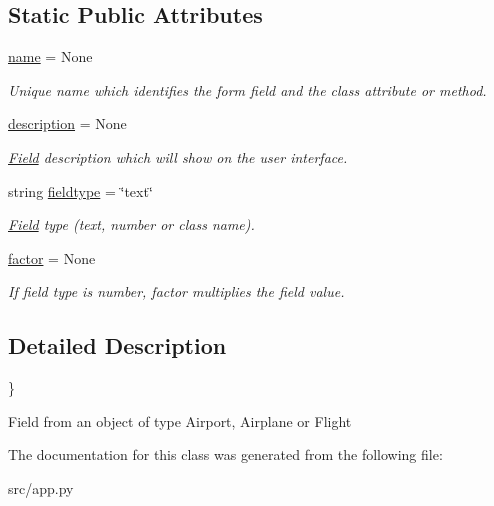 \subsection*{Static Public Attributes}
\begin{DoxyCompactItemize}
\item 
\hyperlink{group___g_u_i_ga74bf1ee16d2de49ee707cab9ecba123b}{name} = None
\begin{DoxyCompactList}\small\item\em Unique name which identifies the form field and the class attribute or method. \end{DoxyCompactList}\item 
\hyperlink{group___g_u_i_gadd42fca0c131874daa29902266d514cd}{description} = None
\begin{DoxyCompactList}\small\item\em \hyperlink{classapp_1_1_app_1_1_field}{Field} description which will show on the user interface. \end{DoxyCompactList}\item 
string \hyperlink{group___g_u_i_ga2b84546c227ee521e1a4776cd07aabe8}{fieldtype} = \char`\"{}text\char`\"{}
\begin{DoxyCompactList}\small\item\em \hyperlink{classapp_1_1_app_1_1_field}{Field} type (text, number or class name). \end{DoxyCompactList}\item 
\hyperlink{group___g_u_i_ga6a50e1c443b963d286ed393be38e00fd}{factor} = None
\begin{DoxyCompactList}\small\item\em If field type is number, factor multiplies the field value. \end{DoxyCompactList}\end{DoxyCompactItemize}


\subsection{Detailed Description}
\} 

\begin{DoxyVerb}Field from an object of type Airport, Airplane or Flight\end{DoxyVerb}
 

The documentation for this class was generated from the following file\+:\begin{DoxyCompactItemize}
\item 
src/app.\+py\end{DoxyCompactItemize}
